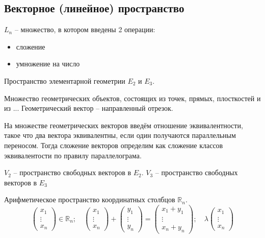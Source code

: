 \subsection{Векторное (линейное) пространство}

\begin{definition}
  $L_n$ -- множество, в котором введены 2 операции:
  \begin{itemize}
    \item сложение
    \item умножение на число
  \end{itemize}
\end{definition}

\begin{ex}
  Пространство элементарной геометрии $E_2$ и $E_3$.

  Множество геометрических объектов, состоящих из точек, прямых, плосткостей и из ... Геометрический
  вектор -- направленный отрезок.

  На множестве геометрических векторов введём отношение эквивалентности, такое что два вектора
  эквивалентны, если один получаются параллельным переносом. Тогда сложение векторов определим
  как сложение классов эквивалентости по правилу параллелограма. 

  $V_2$ -- пространство свободных векторов в $E_2$.
  $V_3$ -- пространство свободных векторов в $E_3$
\end{ex}

\begin{ex}
  Арифметическое пространство координатных столбцов $\mathbb{R}_n$.
  \[
    \begin{pmatrix}
      x_1 \\
      \vdots \\
      x_n
    \end{pmatrix} \in \mathbb{R}_n; \quad
    \begin{pmatrix}
      x_1 \\
      \vdots \\
      x_n
    \end{pmatrix} + \begin{pmatrix}
      y_1 \\
      \vdots \\
      y_n
    \end{pmatrix} = 
    \begin{pmatrix}
      x_1 + y_1 \\
      \vdots \\
      x_n + y_n
    \end{pmatrix}; \quad
    \lambda \begin{pmatrix}
      x_1 \\
      \vdots \\
      x_n
    \end{pmatrix} 
  \]
\end{ex}

